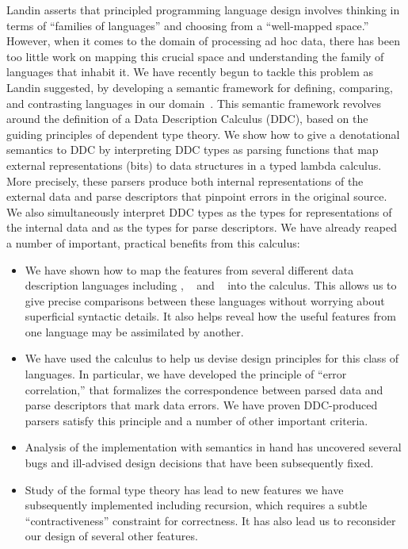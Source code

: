 \documentclass[11pt]{article}
\begin{document}
Landin asserts that principled programming language design involves
thinking in terms of ``families of languages'' and choosing from a
``well-mapped space.''  However, when it comes to the domain of
processing ad hoc data, there has been too little work on mapping this
crucial space and understanding the family of languages that
inhabit it.  We have recently begun to tackle this problem
as Landin suggested, by developing a semantic
framework for defining, comparing, and contrasting languages
in our domain~\cite{fisher+:700}.  This semantic framework revolves around the
definition of a Data Description Calculus (DDC),
based on the guiding principles of dependent type theory.  
We show how to give a denotational semantics
to DDC by interpreting DDC
types as parsing functions that map external representations (bits)
to data structures in a typed lambda calculus.  More precisely,
these parsers produce both 
internal representations of the external data and
parse descriptors that pinpoint errors in the original source.
We also simultaneously interpret DDC types as the types for
representations of the internal data and as the types for parse descriptors.
We have already reaped a number of important, practical benefits from this calculus:
\begin{itemize}
\item We have shown how to map the features from several different data description languages including \pads, \packettypes{}~\cite{sigcomm00} and
\datascript{}~\cite{gpce02} into the calculus.  This allows us to give
precise comparisons between these languages without worrying about
superficial syntactic details.  It also helps reveal how the useful features
from one language may be assimilated by another.
\item We have used the calculus to help us devise design
principles for this class of languages.  In particular, we
have developed the principle of ``error correlation,'' that formalizes
the correspondence between parsed data and parse descriptors that mark
data errors.  We have proven DDC-produced parsers satisfy this principle
and a number of other important criteria.
\item Analysis of the \pads{} implementation with semantics in hand
has uncovered several bugs and ill-advised design decisions
that have been subsequently fixed.
\item Study of the formal type theory has lead to new features we have 
subsequently implemented including recursion, which requires a subtle 
``contractiveness'' constraint for correctness.  It has also lead us
to reconsider our design of several other features.
\end{itemize}
\end{document}
